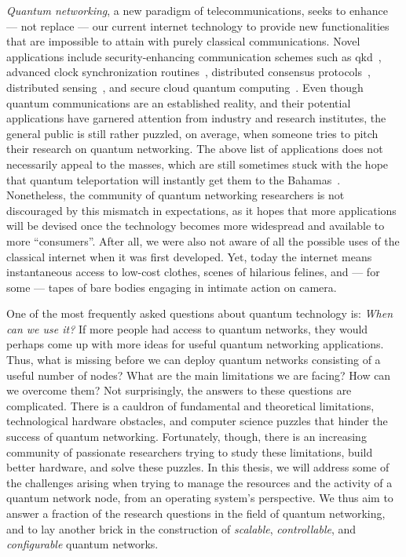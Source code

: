 \emph{Quantum networking}, a new paradigm of telecommunications, seeks to enhance --- not replace
--- our current internet technology to provide new functionalities that are impossible to attain
with purely classical communications. Novel applications include security-enhancing communication
schemes such as \acrfull{qkd}~\cite{bennett_2014_bb84, ekert_1991_e91}, advanced clock
synchronization routines~\cite{komar_2014_clocks}, distributed consensus
protocols~\cite{benor_2005_byzantine}, distributed sensing~\cite{gottesman_2012_telescope}, and
secure cloud quantum computing~\cite{broadbent_2009_ubqc, childs_2005_secure_qc}. Even though
quantum communications are an established reality, and their potential applications have garnered
attention from industry and research institutes, the general public is still rather puzzled, on
average, when someone tries to pitch their research on quantum networking. The above list of
applications does not necessarily appeal to the masses, which are still sometimes stuck with the
hope that quantum teleportation will instantly get them to the Bahamas~\cite{xkcd_teleportation}.
Nonetheless, the community of quantum networking researchers is not discouraged by this mismatch in
expectations, as it hopes that more applications will be devised once the technology becomes more
widespread and available to more ``consumers''. After all, we were also not aware of all the
possible uses of the classical internet when it was first developed. Yet, today the internet means
instantaneous access to low-cost clothes, scenes of hilarious felines, and --- for some --- tapes of
bare bodies engaging in intimate action on camera.

One of the most frequently asked questions about quantum technology is: \emph{When can we use it?}
If more people had access to quantum networks, they would perhaps come up with more ideas for useful
quantum networking applications. Thus, what is missing before we can deploy quantum networks
consisting of a useful number of nodes? What are the main limitations we are facing? How can we
overcome them? Not surprisingly, the answers to these questions are complicated. There is a cauldron
of fundamental and theoretical limitations, technological hardware obstacles, and computer science
puzzles that hinder the success of quantum networking. Fortunately, though, there is an increasing
community of passionate researchers trying to study these limitations, build better hardware, and
solve these puzzles. In this thesis, we will address some of the challenges arising when trying to
manage the resources and the activity of a quantum network node, from an operating system's
perspective. We thus aim to answer a fraction of the research questions in the field of quantum
networking, and to lay another brick in the construction of \emph{scalable}, \emph{controllable},
and \emph{configurable} quantum networks.


